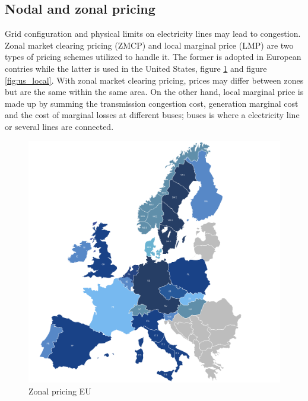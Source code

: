 \subsection{Nodal and zonal pricing}
Grid configuration and physical limits on electricity lines may lead to congestion. Zonal market clearing pricing (ZMCP) and local marginal price (LMP) are two types of pricing schemes utilized to handle it. The former is adopted in European contries while the latter is used in the United States, figure \ref{fig:eu_zonal} and figure \ref{fig:us_local}.
With zonal market clearing pricing, prices may differ between zones but are the same within the same area.
On the other hand, local marginal price is made up by summing the transmission congestion cost, generation marginal cost and the cost of marginal losses at different buses; buses is where a electricity line or several lines are connected.
\begin{figure}[!h]
    \includegraphics[width=\textwidth]{images/eu_zonal.png}
    \caption[Zonal pricing EU]{Zonal pricing EU }
    \label{fig:eu_zonal}
\end{figure}

